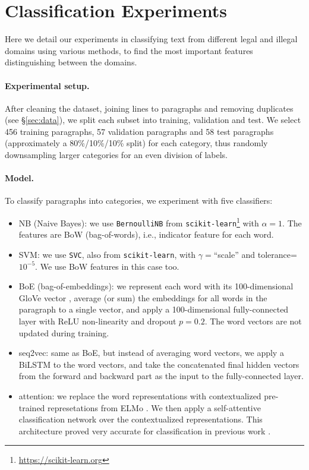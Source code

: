 \documentclass[11pt,a4paper,table]{article}
\begin{document}
\section{Classification Experiments}

Here we detail our experiments in classifying text from different legal and
illegal domains using various methods, to find the most important features
distinguishing between the domains.

\paragraph{Experimental setup.}

After cleaning the dataset, joining lines to paragraphs and removing duplicates
(see \S\ref{sec:data}), we split each subset into training, validation and test.
We select 456 training paragraphs, 57 validation paragraphs and
58 test paragraphs (approximately a 80\%/10\%/10\% split) for each category,
thus randomly downsampling larger categories for an even division of labels.

\paragraph{Model.}

To classify paragraphs into categories, we experiment with five classifiers:

\begin{itemize}
  \item NB (Naive Bayes): we use \texttt{BernoulliNB} from
  \texttt{scikit-learn}\footnote{\url{https://scikit-learn.org}}
  with $\alpha=1$.
  The features are BoW (bag-of-words), i.e., indicator feature for each word.
  \item SVM: we use \texttt{SVC}, also from \texttt{scikit-learn},
  with $\gamma=$``scale'' and tolerance=$10^{-5}$.
  We use BoW features in this case too.
  \item BoE (bag-of-embeddings): we represent each word with its 100-dimensional
  GloVe vector \cite{pennington2014glove}, average (or sum) the embeddings for all words in the paragraph
  to a single vector, and apply a 100-dimensional fully-connected layer with
  ReLU non-linearity and dropout $p=0.2$.
  The word vectors are not updated during training.
  \item seq2vec: same as BoE, but instead of averaging word vectors,
  we apply a BiLSTM to the word vectors, and take the concatenated
  final hidden vectors from the forward and backward part as the input to the
  fully-connected layer.
  \item attention: we replace the word representations with contextualized
  pre-trained represetations from ELMo \cite{Peters:2018}. We then apply a self-attentive
  classification network \cite{mccann2017learned} over the contextualized representations. This architecture proved very accurate for classification in
  previous work \cite{W18-5427,D18-1401}.
\end{itemize}
\end{document}
